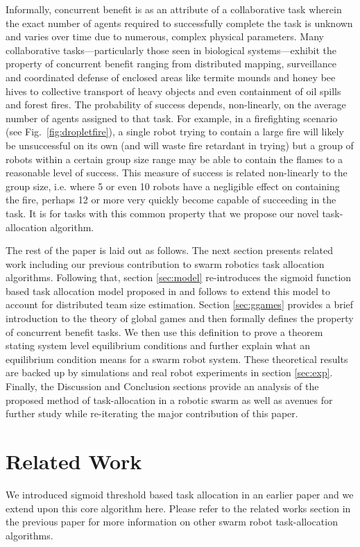 \documentclass[conference]{ieeeconf}
\begin{document}
Informally, concurrent benefit is as an attribute of a collaborative task wherein the exact number of agents required to successfully complete the task is unknown and varies over time due to numerous, complex physical parameters. Many collaborative tasks---particularly those seen in biological systems---exhibit the property of concurrent benefit ranging from distributed mapping, surveillance and coordinated defense of enclosed areas like termite mounds and honey bee hives to collective transport of heavy objects and even containment of oil spills and forest fires. The probability of success depends, non-linearly, on the average number of agents assigned to that task. For example, in a firefighting scenario (see Fig.~\ref{fig:dropletfire}), a single robot trying to contain a large fire will likely be unsuccessful on its own (and will waste fire retardant in trying) but a group of robots within a certain group size range may be able to contain the flames to a reasonable level of success. This measure of success is related non-linearly to the group size, i.e. where 5 or even 10 robots have a negligible effect on containing the fire, perhaps 12 or more very quickly become capable of succeeding in the task. It is for tasks with this common property that we propose our novel task-allocation algorithm.

The rest of the paper is laid out as follows. The next section presents related work including our previous contribution to swarm robotics task allocation algorithms. Following that, section \ref{sec:model} re-introduces the sigmoid function based task allocation model proposed in \cite{Kanakia2014} and follows to extend this model to account for distributed team size estimation. Section \ref{sec:ggames} provides a brief introduction to the theory of global games and then formally defines the property of concurrent benefit tasks. We then use this definition to prove a theorem stating system level equilibrium conditions and further explain what an equilibrium condition means for a swarm robot system. These theoretical results are backed up by simulations and real robot experiments in section \ref{sec:exp}. Finally, the Discussion and Conclusion sections provide an analysis of the proposed method of task-allocation in a robotic swarm as well as avenues for further study while re-iterating the major contribution of this paper.

\section{Related Work}\label{subsec:rw}
We introduced sigmoid threshold based task allocation in an earlier paper \cite{Kanakia2014} and we extend upon this core algorithm here. Please refer to the related works section in the previous paper for more information on other swarm robot task-allocation algorithms.
\end{document}
